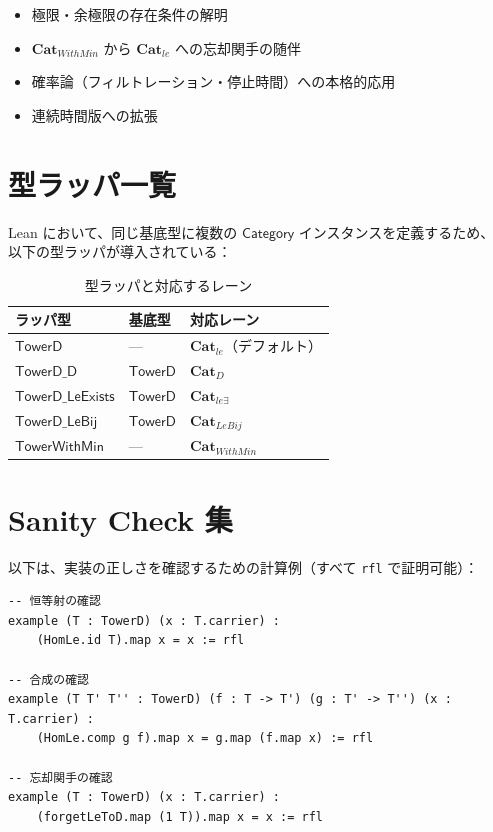 \documentclass[a4paper,11pt]{ltjsarticle}
\theoremstyle{definition}
\theoremstyle{plain}
\newcommand{\CatD}{\mathbf{Cat}_D}
\newcommand{\Catle}{\mathbf{Cat}_{le}}
\newcommand{\CatleE}{\mathbf{Cat}_{le\exists}}
\newcommand{\CatLeBij}{\mathbf{Cat}_{LeBij}}
\newcommand{\CatWithMin}{\mathbf{Cat}_{WithMin}}
\begin{document}
\begin{itemize}
  \item 極限・余極限の存在条件の解明
  \item $\CatWithMin$ から $\Catle$ への忘却関手の随伴
  \item 確率論（フィルトレーション・停止時間）への本格的応用
  \item 連続時間版への拡張
\end{itemize}

\appendix
\section{型ラッパ一覧}
\label{app:type-wrappers}

Lean において、同じ基底型に複数の $\mathsf{Category}$ インスタンスを定義するため、
以下の型ラッパが導入されている：

\begin{table}[htbp]
\centering
\caption{型ラッパと対応するレーン}
\begin{tabular}{lll}
\toprule
ラッパ型 & 基底型 & 対応レーン \\
\midrule
$\mathsf{TowerD}$ & --- & $\Catle$（デフォルト） \\
$\mathsf{TowerD\_D}$ & $\mathsf{TowerD}$ & $\CatD$ \\
$\mathsf{TowerD\_LeExists}$ & $\mathsf{TowerD}$ & $\CatleE$ \\
$\mathsf{TowerD\_LeBij}$ & $\mathsf{TowerD}$ & $\CatLeBij$ \\
$\mathsf{TowerWithMin}$ & --- & $\CatWithMin$ \\
\bottomrule
\end{tabular}
\end{table}

\section{Sanity Check 集}
\label{app:sanity-checks}

以下は、実装の正しさを確認するための計算例（すべて \texttt{rfl} で証明可能）：

\begin{leancode}
\begin{lstlisting}
-- 恒等射の確認
example (T : TowerD) (x : T.carrier) :
    (HomLe.id T).map x = x := rfl

-- 合成の確認
example (T T' T'' : TowerD) (f : T -> T') (g : T' -> T'') (x : T.carrier) :
    (HomLe.comp g f).map x = g.map (f.map x) := rfl

-- 忘却関手の確認
example (T : TowerD) (x : T.carrier) :
    (forgetLeToD.map (1 T)).map x = x := rfl
\end{lstlisting}
\end{leancode}
\end{document}
